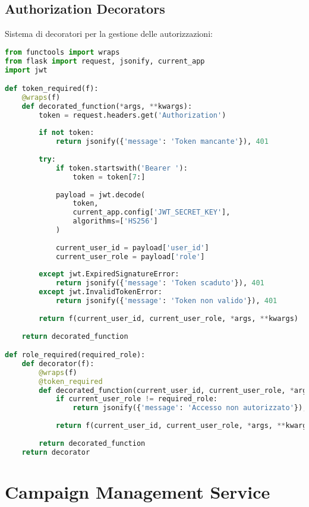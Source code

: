 \documentclass[12pt,a4paper]{report}
\begin{document}
\subsection{Authorization Decorators}

Sistema di decoratori per la gestione delle autorizzazioni:

\begin{lstlisting}[language=Python, caption=Authorization Decorators]
from functools import wraps
from flask import request, jsonify, current_app
import jwt

def token_required(f):
    @wraps(f)
    def decorated_function(*args, **kwargs):
        token = request.headers.get('Authorization')
        
        if not token:
            return jsonify({'message': 'Token mancante'}), 401
        
        try:
            if token.startswith('Bearer '):
                token = token[7:]
            
            payload = jwt.decode(
                token, 
                current_app.config['JWT_SECRET_KEY'], 
                algorithms=['HS256']
            )
            
            current_user_id = payload['user_id']
            current_user_role = payload['role']
            
        except jwt.ExpiredSignatureError:
            return jsonify({'message': 'Token scaduto'}), 401
        except jwt.InvalidTokenError:
            return jsonify({'message': 'Token non valido'}), 401
        
        return f(current_user_id, current_user_role, *args, **kwargs)
    
    return decorated_function

def role_required(required_role):
    def decorator(f):
        @wraps(f)
        @token_required
        def decorated_function(current_user_id, current_user_role, *args, **kwargs):
            if current_user_role != required_role:
                return jsonify({'message': 'Accesso non autorizzato'}), 403
            
            return f(current_user_id, current_user_role, *args, **kwargs)
        
        return decorated_function
    return decorator
\end{lstlisting}

\section{Campaign Management Service}
\end{document}
